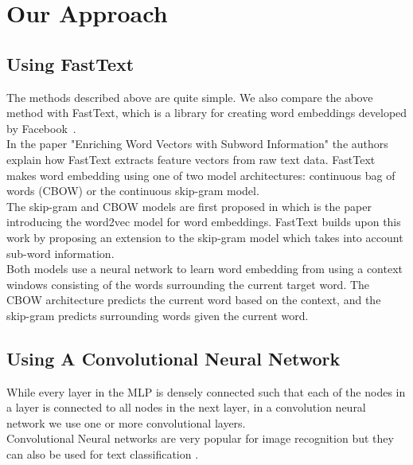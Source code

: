 \section{Our Approach}

\subsection{Using FastText}

The methods described above are quite simple. We also compare the above method with FastText, which is a library for creating word embeddings developed by Facebook~\cite{BagOfTricks}. \\

In the paper "Enriching Word Vectors with Subword Information" \cite{EnrichingWordVectors} the authors explain how FastText extracts feature vectors from raw text data. FastText makes word embedding using one of two model architectures: continuous bag of words (CBOW) or the continuous skip-gram model.\\

The skip-gram and CBOW models are first proposed in \cite{EfficientWordRepresentations} which is the paper introducing the word2vec model for word embeddings. FastText builds upon this work by proposing an extension to the skip-gram model which takes into account sub-word information.\\

Both models use a neural network to learn word embedding from using a context windows consisting of the words surrounding the current target word. The CBOW architecture predicts the current word based on the context, and the skip-gram predicts surrounding words given the current word.\cite{EfficientWordRepresentations}\\

\subsection{Using A Convolutional Neural Network}

While every layer in the MLP is densely connected such that each of the nodes in a layer is connected to all nodes in the next layer, in a convolution neural network we use one or more convolutional layers.\\

Convolutional Neural networks are very popular for image recognition but they can also be used for text classification \cite{textcnn_google}.

